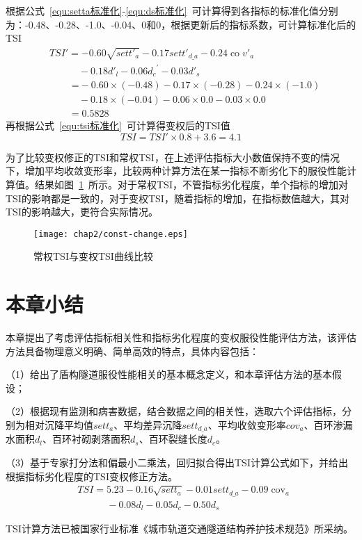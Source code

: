 根据公式~\ref{equ:setta标准化}-\ref{equ:ds标准化}~可计算得到各指标的标准化值分别为：-0.48、-0.28、-1.0、-0.04、0和0，根据更新后的指标系数，可计算标准化后的TSI
\begin{align}
  & TS{I}'=-0.60\sqrt{set{{{{t}'}}_{a}}}-0.17set{{{{t}'}}_{d\_a}}-0.24\operatorname{co}{{{{v}'}}_{a}} \nonumber \\ 
 & \quad \quad \quad -0.18{{{{d}'}}_{l}}-0.06{{d}_{c}}^{\prime }-0.03{{{{d}'}}_{s}} \nonumber \\ 
 & \quad \quad \; \text{=}-\text{0}\text{.60}\times (-0.48)-0.17\times (-0.28)-0.24\times (-1.0) \nonumber \\ 
 & \quad \quad \quad -0.18\times (-0.04)-0.06\times 0.0-0.03\times 0.0 \nonumber \\ 
 & \quad \quad =0.5828 \nonumber
\end{align}
再根据公式~\ref{equ:tsi标准化}~可计算得变权后的TSI值
\begin{equation}
    TSI=TS{I}'\times 0.8+3.6=4.1 \nonumber
\end{equation}

为了比较变权修正的TSI和常权TSI，在上述评估指标大小数值保持不变的情况下，增加平均收敛变形率，比较两种计算方法在某一指标不断劣化下的服役性能计算值。结果如图~\ref{fig:常权TSI与变权TSI曲线比较}~所示。对于常权TSI，不管指标劣化程度，单个指标的增加对TSI的影响都是一致的，对于变权TSI，随着指标的增加，在指标数值越大，其对TSI的影响越大，更符合实际情况。

\begin{figure}[htb!]
    \centering
    \texttt{[image: chap2/const-change.eps]}
    \caption{常权TSI与变权TSI曲线比较}
    \label{fig:常权TSI与变权TSI曲线比较}
\end{figure}

\section{本章小结}

本章提出了考虑评估指标相关性和指标劣化程度的变权服役性能评估方法，该评估方法具备物理意义明确、简单高效的特点，具体内容包括：

（1）给出了盾构隧道服役性能相关的基本概念定义，和本章评估方法的基本假设；

（2）根据现有监测和病害数据，结合数据之间的相关性，选取六个评估指标，分别为相对沉降平均值${sett}_{a}$、平均差异沉降$set{{t}_{d\_a}}$、平均收敛变形率${cov}_{a}$、百环渗漏水面积${d}_{l}$、百环衬砌剥落面积${d}_{s}$、百环裂缝长度${d}_{c}$。

（3）基于专家打分法和偏最小二乘法，回归拟合得出TSI计算公式如下，并给出根据指标劣化程度的TSI变权修正方法。
\begin{align}
  & TSI=5.23-0.16\sqrt{set{{t}_{a}}}-0.01set{{t}_{d\_a}}-0.09{{\operatorname{cov}}_{a}} \nonumber \\ 
 & \quad \quad \quad -0.08{{d}_{l}}-0.05{{d}_{c}}-0.50{{d}_{s}} \nonumber 
\end{align}

TSI计算方法已被国家行业标准《城市轨道交通隧道结构养护技术规范》所采纳。

